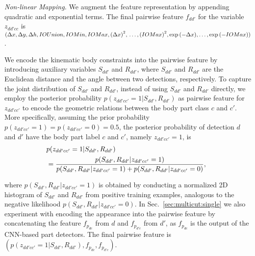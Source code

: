 {\it Non-linear Mapping.}
We augment the feature representation by appending quadratic and exponential terms.
The final pairwise feature  $f_{dd'}$ for the variable $z_{dd'cc}$ is
$(\Delta x, \Delta y, \Delta h,IOUnion, IOMin, IOMax,{(\Delta x)}^2, \\ \ldots, {(IOMax)}^2, \exp{(-{\Delta x})}, \ldots, \exp{(-{IOMax})})$.

We encode the kinematic body constraints into the pairwise feature by
introducing auxiliary variables $ S_{dd'}$ and $R_{dd'}$, where
$S_{dd'}$ and $R_{dd'}$ are the Euclidean distance and the angle
between two detections, respectively. To capture the joint
distribution of $S_{dd'}$ and $R_{dd'}$, instead of using $S_{dd'}$
and $R_{dd'}$ directly, we employ the posterior probability
$p(z_{dd'cc'} = 1|S_{dd'},R_{dd'})$ as pairwise feature for
$z_{dd'cc'}$ to encode the geometric relations between the body part
class $c$ and $c'$.  More specifically, assuming the prior probability
$p(z_{dd'cc'} = 1) = p(z_{dd'cc'} = 0) = 0.5$, the posterior
probability of detection $d$ and $d'$ have the body part label $c$ and
$c'$, namely $z_{dd'cc'} = 1$, is
\vspace{-0.1cm}
\begin{align}
\small
\noindent
&p(z_{dd'cc'} = 1|S_{dd'},R_{dd'}) \nonumber \\ &=
\frac{p(S_{dd'},R_{dd'}|z_{dd'cc'} = 1)}{p(S_{dd'},R_{dd'}|z_{dd'cc'}
  = 1) + p(S_{dd'},R_{dd'}|z_{dd'cc'} = 0)}, \nonumber
\enspace
\end{align}
\vspace{-0.1cm}

\noindent where $p(S_{dd'},R_{dd'}|z_{dd'cc'} = 1)$ is obtained by
conducting a normalized 2D histogram of $S_{dd'}$ and $R_{dd'}$ from
positive training examples, analogous to the negative likelihood
$p(S_{dd'},R_{dd'}|z_{dd'cc'} = 0)$. In Sec.~\ref{sec:multicut:single}
we also experiment with encoding the appearance into the pairwise
feature by concatenating the feature $f_{p_{dc}}$ from $d$ and
$f_{p_{d'c}}$ from $d'$, as $f_{p_{dc}}$ is the output of the CNN-based part
detectors. The final pairwise feature is $(p(z_{dd'cc'} =
1|S_{dd'},R_{dd'}),f_{p_{dc}},f_{p_{d'c}})$.


